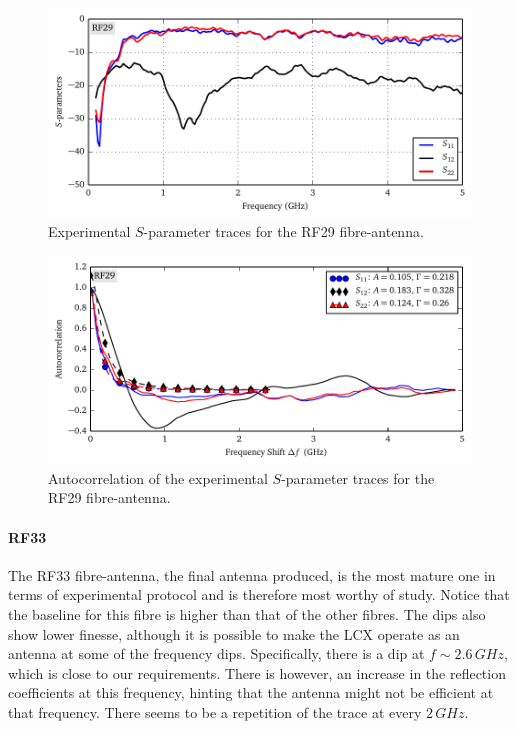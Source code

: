 \begin{figure}
 \centering
 \includegraphics{figs/active/RF29-sParameters.pdf}
 \caption[Experimental $S$-parameter traces for the RF29 fibre-antenna]
 		{Experimental $S$-parameter traces for the RF29 fibre-antenna.}
 \label{fig:active.lcx.rf29sParameters}
\end{figure}

\begin{figure}
 \centering
 \includegraphics{figs/active/RF29-autoCorrelation.pdf}
 \caption[Autocorrelation of the experimental $S$-parameter traces for the RF29 fibre-antenna]
 		{Autocorrelation of the experimental $S$-parameter traces for the RF29 fibre-antenna.}
 \label{fig:active.lcx.rf29autocorrelation}
\end{figure}

\paragraph{RF33}
The RF33 fibre-antenna, the final antenna produced, is the most mature
one in terms of experimental protocol and is therefore most
worthy of study. Notice that the baseline for this fibre is 
higher than that of the other fibres. The dips also show lower finesse,
although it is possible to make the LCX operate as an antenna
at some of the frequency dips. Specifically, there is a dip at
$f\sim2.6\,\unit{GHz}$, which is close to our requirements. 
There is however, an increase in the reflection coefficients
at this frequency, hinting that the antenna might not be 
efficient at that frequency. There seems to be a repetition 
of the trace at every $2\,\unit{GHz}$. 

